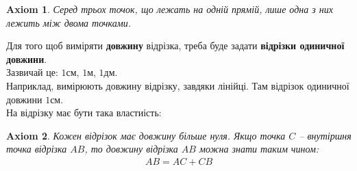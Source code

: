 \documentclass[a4paper, 10pt]{article}
\theoremstyle{theoremdd}
\theoremstyle{theoremdd}
\newtheorem{axiom}{Axiom}
\theoremstyle{theoremdd}
\newtheorem{definition}[theorem]{Definition}
\theoremstyle{theoremdd}
\theoremstyle{theoremdd}
\theoremstyle{theoremdd}
\theoremstyle{theoremdd}
\newtheorem{remark}[theorem]{Remark}
\theoremstyle{theoremdd}
\theoremstyle{theoremdd}
\newtheorem{corollary}[theorem]{Corollary}
\begin{document}
\begin{axiom}
Серед трьох точок, що лежать на одній прямій, лише одна з них лежить між двома точками.
\end{axiom}

Для того щоб виміряти \textbf{довжину} відрізка, треба буде задати \textbf{відрізки одиничної довжини}.\\
Зазвичай це: $1$см, $1$м, $1$дм.\\
Наприклад, вимірюють довжину відрізку, завдяки лінійці. Там відрізок одиничної довжини $1$см.\\
На відрізку має бути така властиість:\\

\begin{axiom}
Кожен відрізок має довжину більше нуля. Якщо точка $C$ -- внутіршня точка відрізка $AB$, то довжину відрізка $AB$ можна знати таким чином:
\begin{align*}
AB = AC + CB
\end{align*}
\begin{figure}[H]
\centering
{}
\end{figure}
\end{axiom}
\end{document}
